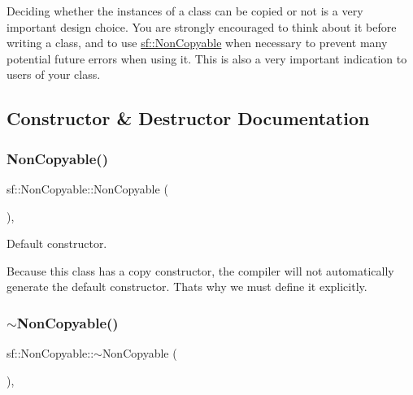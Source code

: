 Deciding whether the instances of a class can be copied or not is a very important design choice. You are strongly encouraged to think about it before writing a class, and to use \mbox{\hyperlink{classsf_1_1_non_copyable}{sf\+::\+Non\+Copyable}} when necessary to prevent many potential future errors when using it. This is also a very important indication to users of your class. \begin{DoxyVerb}\end{DoxyVerb}
 

\subsection{Constructor \& Destructor Documentation}
\mbox{\label{classsf_1_1_non_copyable_a2110add170580fdb946f887719da6860}} 
\subsubsection{\texorpdfstring{NonCopyable()}{NonCopyable()}\hspace{0.1cm}{\footnotesize\ttfamily [1/2]}}
{\footnotesize\ttfamily sf\+::\+Non\+Copyable\+::\+Non\+Copyable (\begin{DoxyParamCaption}{ }\end{DoxyParamCaption})\hspace{0.3cm}{\ttfamily [inline]}, {\ttfamily [protected]}}



Default constructor. 

Because this class has a copy constructor, the compiler will not automatically generate the default constructor. That\textquotesingle{}s why we must define it explicitly. \begin{DoxyVerb}\end{DoxyVerb}
 \mbox{\label{classsf_1_1_non_copyable_a8274ffbf46014f5f7f364befb52c7728}} 
\subsubsection{\texorpdfstring{$\sim$NonCopyable()}{~NonCopyable()}}
{\footnotesize\ttfamily sf\+::\+Non\+Copyable\+::$\sim$\+Non\+Copyable (\begin{DoxyParamCaption}{ }\end{DoxyParamCaption})\hspace{0.3cm}{\ttfamily [inline]}, {\ttfamily [protected]}}



